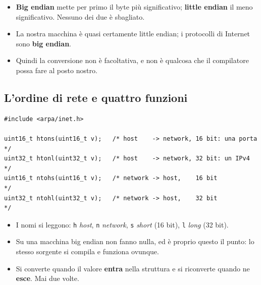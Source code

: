 \begin{itemize}
    \item \textbf{Big endian} mette per primo il byte più significativo; \textbf{little endian} il meno significativo.
          Nessuno dei due è sbagliato.
    \item La nostra macchina è quasi certamente little endian; i protocolli di Internet sono \textbf{big endian}.
    \item Quindi la conversione non è facoltativa, e non è qualcosa che il compilatore possa fare al posto nostro.
\end{itemize}

\subsection{L'ordine di rete e quattro funzioni}


\begin{lstlisting}[language={[POSIX]C}]
#include <arpa/inet.h>

uint16_t htons(uint16_t v);   /* host    -> network, 16 bit: una porta */
uint32_t htonl(uint32_t v);   /* host    -> network, 32 bit: un IPv4   */
uint16_t ntohs(uint16_t v);   /* network -> host,    16 bit            */
uint32_t ntohl(uint32_t v);   /* network -> host,    32 bit            */
\end{lstlisting}

\begin{itemize}
    \item I nomi si leggono: \texttt{h} \emph{host}, \texttt{n} \emph{network}, \texttt{s} \emph{short} (16 bit),
          \texttt{l} \emph{long} (32 bit).
    \item Su una macchina big endian non fanno nulla, ed è proprio questo il punto: lo stesso sorgente si compila e funziona
          ovunque.
    \item Si converte quando il valore \textbf{entra} nella struttura e si riconverte quando ne \textbf{esce}. Mai due volte.
\end{itemize}


